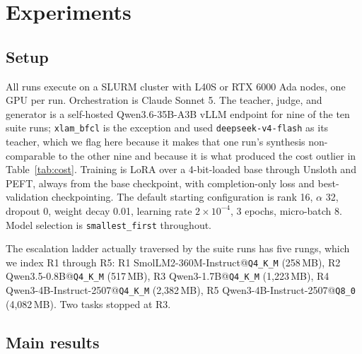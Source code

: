 \documentclass[sigconf,10pt]{acmart}
\newcommand{\tsk}[1]{\texttt{#1}}
\newcommand{\TODO}[1]{\textcolor{red}{\textbf{[TODO: #1]}}}
\begin{document}
\section{Experiments}
\label{sec:results}

\subsection{Setup}

All runs execute on a SLURM cluster with L40S or RTX 6000 Ada nodes, one GPU per run.
Orchestration is Claude Sonnet 5. The teacher, judge, and generator is a self-hosted
Qwen3.6-35B-A3B vLLM endpoint for nine of the ten suite runs; \tsk{xlam\_bfcl} is the
exception and used \texttt{deepseek-v4-flash} as its teacher, which we flag here because it
makes that one run's synthesis non-comparable to the other nine and because it is what
produced the cost outlier in Table~\ref{tab:cost}. Training is LoRA over a 4-bit-loaded base
through Unsloth and PEFT, always from the base checkpoint, with completion-only loss and
best-validation checkpointing. The default starting configuration is rank 16, $\alpha$ 32, dropout 0, weight
decay 0.01, learning rate $2\times10^{-4}$, 3 epochs, micro-batch 8. Model selection is
\texttt{smallest\_first} throughout.

The escalation ladder actually traversed by the suite runs has five rungs, which we index R1
through R5: R1 SmolLM2-360M-Instruct@\texttt{Q4\_K\_M} (258\,MB), R2
Qwen3.5-0.8B@\texttt{Q4\_K\_M} (517\,MB), R3 Qwen3-1.7B@\texttt{Q4\_K\_M} (1{,}223\,MB), R4
Qwen3-4B-Instruct-2507@\texttt{Q4\_K\_M} (2{,}382\,MB), R5
Qwen3-4B-Instruct-2507@\texttt{Q8\_0} (4{,}082\,MB). Two tasks stopped at R3.

\subsection{Main results}
\end{document}
